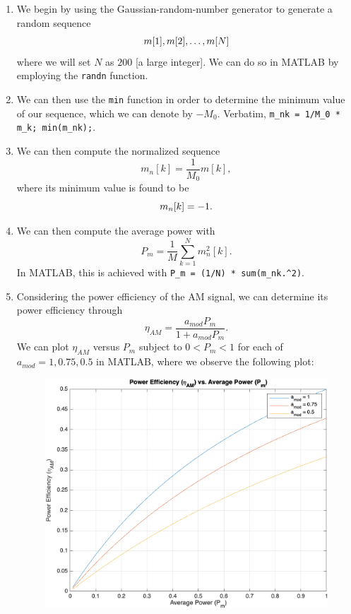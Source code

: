 \documentclass[11pt]{article}
\begin{document}
\begin{enumerate}[label=\textbf{\alph*)}, leftmargin=2.6em]
    \item We begin by using the Gaussian-random-number generator to generate a random sequence
    \begin{equation} \notag
        m[1], m[2], \dots, m[N]
    \end{equation}
    where we will set $N$ as $200$ [a large integer].
    We can do so in MATLAB by employing the \texttt{randn} function.

    \item We can then use the \texttt{min} function in order to determine the 
    minimum value of our sequence, which we can denote by $-M_0$. Verbatim, 
    \verb|m_nk = 1/M_0 * m_k; min(m_nk);|.

    \item We can then compute the normalized sequence
    \begin{equation}
        m_n[k] = \frac{1}{M_0}m[k],
    \end{equation}
    where its minimum value is found to be
    \begin{equation} \notag
        m_n[k] = -1.
    \end{equation}

    \item We can then compute the average power with
    \begin{equation}
        P_m = \frac{1}{M} \sum_{k=1}^{N} m^2_n[k].
    \end{equation}
    In MATLAB, this is achieved with \verb|P_m = (1/N) * sum(m_nk.^2)|.

    \item Considering the power efficiency of the AM signal, we can determine
    its power efficiency through
    \begin{equation}
        \eta_{AM} = \frac{a_{mod} P_m}{1+a_{mod} P_m}.
    \end{equation}
    We can plot $\eta_{AM}$ versus $P_m$ subject to $0<P_m<1$ for each of 
    $a_{mod}=1, 0.75, 0.5$ in MATLAB, where we observe the following plot:
    \begin{figure} [H]
        \centering
        \includegraphics[width=0.6\linewidth]{plot1.png}
    \end{figure}


\end{enumerate}
\end{document}
